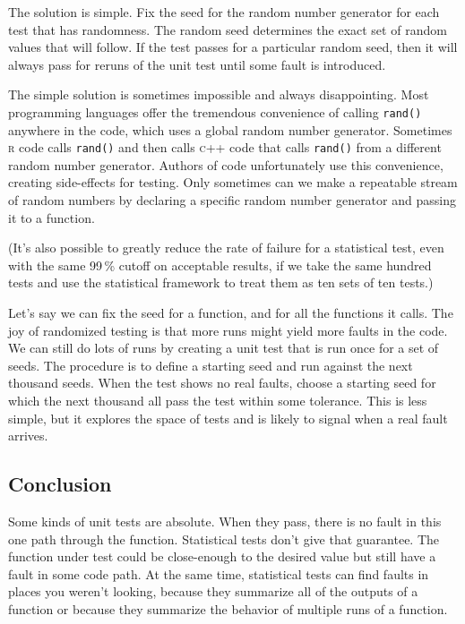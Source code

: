 \documentclass[fleqn,10pt]{olplainarticle}
\newcommand{\rlang}{\textsc{r}\xspace}
\newcommand{\cpp}{\textsc{c}++\xspace}
\begin{document}
The solution is simple. Fix the seed for the random number
generator for each test that has randomness. The random
seed determines the exact set of random values that will
follow. If the test passes for a particular random seed,
then it will always pass for reruns of the unit test until
some fault is introduced.

The simple solution is sometimes impossible and always
disappointing. Most programming languages offer the tremendous
convenience of calling \lstinline!rand()! anywhere in the
code, which uses a global random number generator. Sometimes
\rlang code calls \lstinline!rand()! and then calls \cpp code
that calls \lstinline!rand()! from a different random number
generator. Authors
of code unfortunately use this convenience, creating side-effects
for testing. Only sometimes can we make a repeatable
stream of random numbers by declaring a specific random number generator
and passing it to a function.

(It's also possible to greatly reduce the rate of failure
for a statistical test, even with the same 99\,\% cutoff
on acceptable results, if we take the same hundred tests
and use the statistical framework to treat them as ten sets
of ten tests.)

Let's say we can fix the seed for a function, and for all the
functions it calls. The joy of randomized testing is that more
runs might yield more faults in the code. We
can still do lots of runs by creating a unit test that is run once
for a set of seeds.  The procedure is to define a starting seed and run against
the next thousand seeds. When the test shows no real faults,
choose a starting seed for which the next thousand all pass
the test within some tolerance. This is less simple, but it
explores the space of tests and is likely to signal when
a real fault arrives.

\subsection{Conclusion}

Some kinds of unit tests are absolute. When they pass,
there is no fault in this one path through the function.
Statistical tests don't give that guarantee. The function
under test could be close-enough to the desired value but
still have a fault in some code path.
At the same time, statistical tests can find faults
in places you weren't looking, because they summarize all
of the outputs of a function or because they summarize
the behavior of multiple runs of a function.
\end{document}
